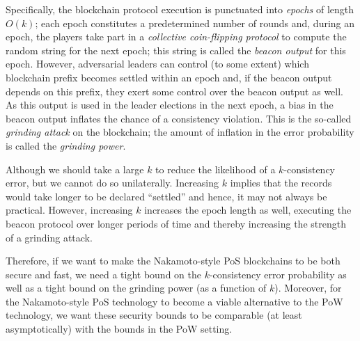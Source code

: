 Specifically, the blockchain protocol execution is punctuated into \emph{epochs} of length $O(k)$; 
each epoch constitutes a predetermined number of rounds 
and, during an epoch, 
the players take part in a \emph{collective coin-flipping protocol} 
to compute the random string for the next epoch; 
this string is called the \emph{beacon output} for this epoch.
However, adversarial leaders can control (to some extent) 
which blockchain prefix becomes settled within an epoch and, 
if the beacon output depends on this prefix,  
they exert some control over the beacon output as well. 
As this output is used in the leader elections in the next epoch, 
a bias in the beacon output inflates the chance of a consistency violation. 
This is the so-called \emph{grinding attack} on the blockchain; 
the amount of inflation in the error probability is called the \emph{grinding power}.


Although we should take a large $k$ to 
reduce the likelihood of a $k$-consistency error, but 
we cannot do so unilaterally. 
Increasing $k$ implies that the records 
would take longer to be declared ``settled'' 
and hence, it may not always be practical.
However, increasing $k$ 
increases the epoch length as well, 
executing the beacon protocol over longer periods of time and 
thereby increasing the strength of a grinding attack. 

Therefore, 
if we want to make the Nakamoto-style PoS blockchains to be 
both secure and fast, 
we need a tight bound on the $k$-consistency error probability
as well as 
a tight bound on the grinding power (as a function of $k$). 
Moreover, 
for the Nakamoto-style PoS technology  
to become a viable alternative to the PoW technology, 
we want these security bounds to be comparable (at least asymptotically) 
with the bounds in the PoW setting.













